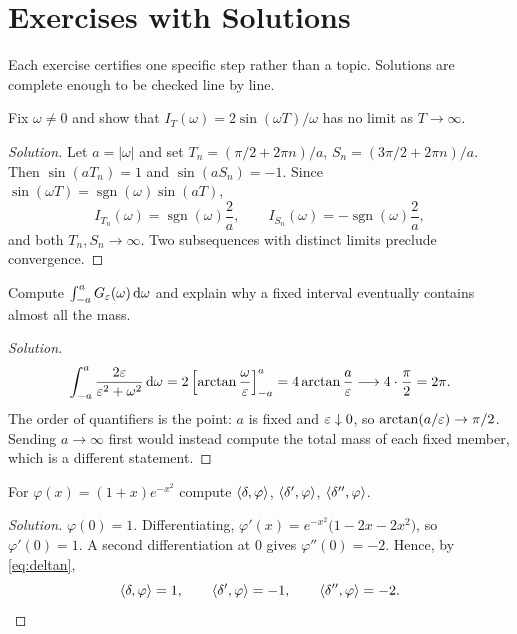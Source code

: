 \chapter{Exercises with Solutions}
\label{app:exercises}

Each exercise certifies one specific step rather than a topic. Solutions are complete enough to be
checked line by line.

\begin{exercise}\label{ex1}
Fix $\omega\neq0$ and show that $I_{T}(\omega)=2\sin(\omega T)/\omega$ has no limit as
$T\to\infty$.
\end{exercise}

\begin{proof}[Solution]
Let $a=|\omega|$ and set $T_{n}=(\pi/2+2\pi n)/a$, $S_{n}=(3\pi/2+2\pi n)/a$. Then
$\sin(aT_{n})=1$ and $\sin(aS_{n})=-1$. Since $\sin(\omega T)=\operatorname{sgn}(\omega)\sin(aT)$,
\begin{equation}
I_{T_{n}}(\omega)=\operatorname{sgn}(\omega)\frac{2}{a},
\qquad
I_{S_{n}}(\omega)=-\operatorname{sgn}(\omega)\frac{2}{a},
\end{equation}
and both $T_{n},S_{n}\to\infty$. Two subsequences with distinct limits preclude convergence.
\end{proof}

\begin{exercise}\label{ex2}
Compute $\int_{-a}^{a}G_{\varepsilon}(\omega)\,\mathrm{d}\omega$ and explain why a fixed interval eventually contains
almost all the mass.
\end{exercise}

\begin{proof}[Solution]
\begin{equation}
\int_{-a}^{a}\frac{2\varepsilon}{\varepsilon^{2}+\omega^{2}}\,\mathrm{d}\omega
=2\left[\arctan\frac{\omega}{\varepsilon}\right]_{-a}^{a}
=4\arctan\frac{a}{\varepsilon}\longrightarrow4\cdot\frac{\pi}{2}=2\pi .
\end{equation}
The order of quantifiers is the point: $a$ is fixed and $\varepsilon\downarrow0$, so $\arctan(a/\varepsilon)\to\pi/2$.
Sending $a\to\infty$ first would instead compute the total mass of each fixed member, which is a
different statement.
\end{proof}

\begin{exercise}\label{ex3}
For $\varphi(x)=(1+x)e^{-x^{2}}$ compute $\langle \delta,\varphi\rangle$, $\langle \delta',\varphi\rangle$,
$\langle \delta'',\varphi\rangle$.
\end{exercise}

\begin{proof}[Solution]
$\varphi(0)=1$. Differentiating,
$\varphi'(x)=e^{-x^{2}}\big(1-2x-2x^{2}\big)$, so $\varphi'(0)=1$. A second differentiation at $0$
gives $\varphi''(0)=-2$. Hence, by \eqref{eq:deltan},
\begin{equation}
\langle \delta,\varphi\rangle=1,\qquad
\langle \delta',\varphi\rangle=-1,\qquad
\langle \delta'',\varphi\rangle=-2 .
\end{equation}
\end{proof}

